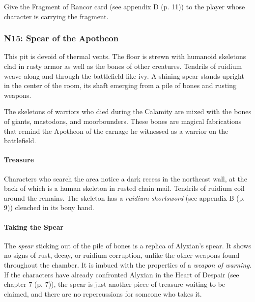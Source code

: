 \documentclass[letterpaper, 11pt, bg=full, twocolumn]{dndbook}
\begin{document}
Give the Fragment of Rancor card (see appendix D (p. 11)) to the player whose character is carrying the fragment.


\subsubsection{N15: Spear of the Apotheon}

\begin{DndReadAloud}
This pit is devoid of thermal vents. The floor is strewn with humanoid skeletons clad in rusty armor as well as the bones of other creatures. Tendrils of ruidium weave along and through the battlefield like ivy. A shining spear stands upright in the center of the room, its shaft emerging from a pile of bones and rusting weapons.
\end{DndReadAloud}

The skeletons of warriors who died during the Calamity are mixed with the bones of giants, mastodons, and moorbounders. These bones are magical fabrications that remind the Apotheon of the carnage he witnessed as a warrior on the battlefield.

\paragraph{Treasure}

Characters who search the area notice a dark recess in the northeast wall, at the back of which is a human skeleton in rusted chain mail. Tendrils of ruidium coil around the remains. The skeleton has a \textit{ruidium shortsword} (see appendix B (p. 9)) clenched in its bony hand.

\paragraph{Taking the Spear}

The \textit{spear} sticking out of the pile of bones is a replica of Alyxian's spear. It shows no signs of rust, decay, or ruidium corruption, unlike the other weapons found throughout the chamber. It is imbued with the properties of a \textit{weapon of warning}. If the characters have already confronted Alyxian in the Heart of Despair (see chapter 7 (p. 7)), the spear is just another piece of treasure waiting to be claimed, and there are no repercussions for someone who takes it.
\end{document}
